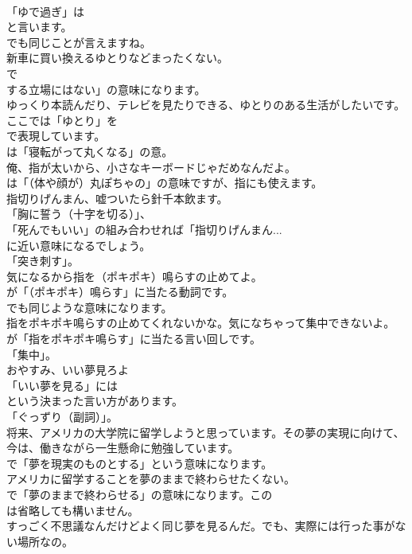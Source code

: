 \documentclass[8pt]{extreport}
\begin{document}
\begin{CJK}{UTF8}{min}
\\	「ゆで過ぎ」は
\\	と言います。
\\	でも同じことが言えますね。	
\\	新車に買い換えるゆとりなどまったくない。 
\\	で
\\	する立場にはない」の意味になります。	
\\	ゆっくり本読んだり、テレビを見たりできる、ゆとりのある生活がしたいです。 
\\	ここでは「ゆとり」を 
\\	で表現しています。
\\	は「寝転がって丸くなる」の意。	
\\	俺、指が太いから、小さなキーボードじゃだめなんだよ。 
\\	は「（体や顔が）丸ぽちゃの」の意味ですが、指にも使えます。	
\\	指切りげんまん、嘘ついたら針千本飲ます。 
\\	「胸に誓う（十字を切る）」、
\\	「死んでもいい」の組み合わせれば「指切りげんまん... 
\\	に近い意味になるでしょう。
\\	「突き刺す」。	
\\	気になるから指を（ポキポキ）鳴らすの止めてよ。 
\\	が「（ポキポキ）鳴らす」に当たる動詞です。
\\	でも同じような意味になります。	
\\	指をポキポキ鳴らすの止めてくれないかな。気になちゃって集中できないよ。 
\\	が「指をポキポキ鳴らす」に当たる言い回しです。
\\	「集中」。	
\\	おやすみ、いい夢見ろよ 
\\	「いい夢を見る」には
\\	という決まった言い方があります。
\\	「ぐっずり（副詞）」。	
\\	将来、アメリカの大学院に留学しようと思っています。その夢の実現に向けて、今は、働きながら一生懸命に勉強しています。 
\\	で「夢を現実のものとする」という意味になります。	
\\	アメリカに留学することを夢のままで終わらせたくない。 
\\	で「夢のままで終わらせる」の意味になります。この
\\	は省略しても構いません。	
\\	すっごく不思議なんだけどよく同じ夢を見るんだ。でも、実際には行った事がない場所なの。 

\end{CJK}
\end{document}
